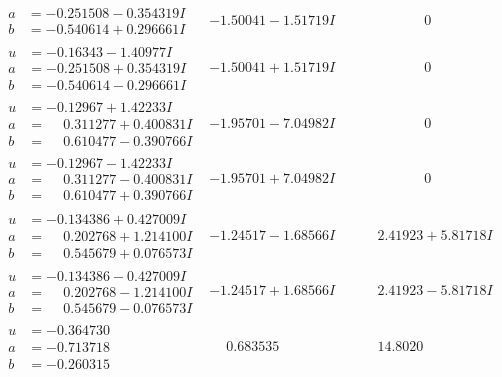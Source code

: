 \documentclass[1p]{elsarticle_modified}
\theoremstyle{definition}
\begin{document}
$$\begin{array}{c|c|c}
\begin{aligned}
a &= -0.251508 - 0.354319 I \\
b &= -0.540614 + 0.296661 I\end{aligned}
 & -1.50041 - 1.51719 I & \phantom{-0.000000 } 0 \\ \hline\begin{aligned}
u &= -0.16343 - 1.40977 I \\
a &= -0.251508 + 0.354319 I \\
b &= -0.540614 - 0.296661 I\end{aligned}
 & -1.50041 + 1.51719 I & \phantom{-0.000000 } 0 \\ \hline\begin{aligned}
u &= -0.12967 + 1.42233 I \\
a &= \phantom{-}0.311277 + 0.400831 I \\
b &= \phantom{-}0.610477 - 0.390766 I\end{aligned}
 & -1.95701 - 7.04982 I & \phantom{-0.000000 } 0 \\ \hline\begin{aligned}
u &= -0.12967 - 1.42233 I \\
a &= \phantom{-}0.311277 - 0.400831 I \\
b &= \phantom{-}0.610477 + 0.390766 I\end{aligned}
 & -1.95701 + 7.04982 I & \phantom{-0.000000 } 0 \\ \hline\begin{aligned}
u &= -0.134386 + 0.427009 I \\
a &= \phantom{-}0.202768 + 1.214100 I \\
b &= \phantom{-}0.545679 + 0.076573 I\end{aligned}
 & -1.24517 - 1.68566 I & \phantom{-}2.41923 + 5.81718 I \\ \hline\begin{aligned}
u &= -0.134386 - 0.427009 I \\
a &= \phantom{-}0.202768 - 1.214100 I \\
b &= \phantom{-}0.545679 - 0.076573 I\end{aligned}
 & -1.24517 + 1.68566 I & \phantom{-}2.41923 - 5.81718 I \\ \hline\begin{aligned}
u &= -0.364730\phantom{ +0.000000I} \\
a &= -0.713718\phantom{ +0.000000I} \\
b &= -0.260315\phantom{ +0.000000I}\end{aligned}
 & \phantom{-}0.683535\phantom{ +0.000000I} & \phantom{-}14.8020\phantom{ +0.000000I}\\

\end{array}$$
\end{document}
